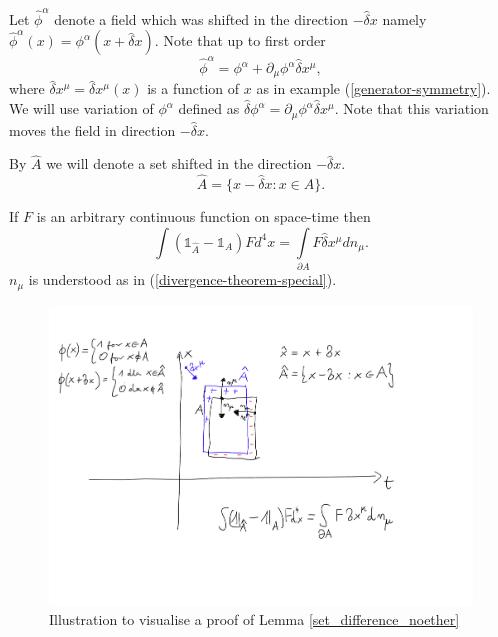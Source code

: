 \documentclass[main.tex]{subfiles}
\begin{document}
Let $\hat{\phi}^\alpha$ denote a field which was shifted in the direction $-\hat{\delta}x$ namely $\hat{\phi}^\alpha(x) = \phi^\alpha(x + \hat{\delta} x)$. Note that up to first order
\begin{equation}
\hat{\phi}^\alpha =  \phi^\alpha + \partial_\mu \phi^\alpha \hat{\delta} x^\mu,
\end{equation}
where $\hat{\delta} x^\mu = \hat{\delta} x^\mu(x)$ is a function of $x$ as in example (\ref{generator-symmetry}). We will use variation of $\phi^\alpha$ defined as $\hat{\delta} \phi^\alpha = \partial_\mu \phi^\alpha \hat{\delta} x^\mu$. Note that this variation moves the field in direction $-\hat{\delta} x$.

By $\hat{A}$ we will denote a set shifted in the direction $-\hat{\delta} x$.
\begin{equation}
\hat{A} = \{ x - \hat{\delta} x : x\in A \}.
\end{equation}
\begin{lemma}
\label{set_difference_noether}
If $F$ is an arbitrary continuous function on space-time then 
\begin{equation}
\int (\mathds{1}_{\hat{A}} - \mathds{1}_A)F d^4 x = \int\limits_{\partial A} F \hat{\delta} x^\mu dn_\mu.
\end{equation}
$n_\mu$ is understood as in (\ref{divergence-theorem-special}).
\end{lemma}
\begin{figure}[H]
\centering
\includegraphics[scale=0.5]{figs/Noether1}
\caption{Illustration to visualise a proof of Lemma \ref{set_difference_noether}}
\end{figure}
\end{document}

